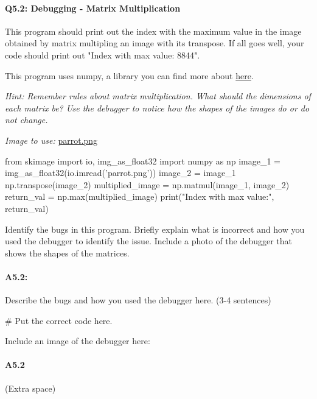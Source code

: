 \documentclass[11pt]{article}
\begin{document}
\pagebreak
\paragraph{Q5.2: Debugging - Matrix Multiplication} This program should print out the index with the maximum value in the image obtained by matrix multipling an image with its transpose. If all goes well, your code should print out "Index with max value: 8844".

This program uses numpy, a library you can find more about \href{https://numpy.org/doc/stable/}{here}.

\emph{Hint: Remember rules about matrix multiplication. What should the dimensions of each matrix be? Use the debugger to notice how the shapes of the images do or do not change.}

\emph{Image to use:} \href{parrot.png}{parrot.png}

\begin{python}
from skimage import io, img_as_float32
import numpy as np
image_1 = img_as_float32(io.imread('parrot.png'))
image_2 = image_1
np.transpose(image_2)
multiplied_image = np.matmul(image_1, image_2)
return_val = np.max(multiplied_image)
print("Index with max value:", return_val)
\end{python}
Identify the bugs in this program. Briefly explain what is incorrect and how you used the debugger to identify the issue. Include a photo of the debugger that shows the shapes of the matrices.


\paragraph{A5.2: } Describe the bugs and how you used the debugger here. (3-4 sentences)
\begin{python}
# Put the correct code here.
\end{python}

Include an image of the debugger here:

\pagebreak
\paragraph{A5.2} (Extra space)
\end{document}
